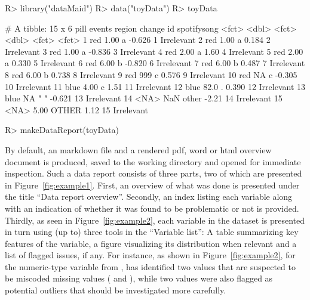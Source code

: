 \documentclass[article,shortnames]{jss}
\begin{document}
\begin{Schunk}
\begin{Sinput}
R> library("dataMaid")
R> data("toyData")
R> toyData
\end{Sinput}
\begin{Soutput}
# A tibble: 15 x 6
   pill  events region change id    spotifysong
   <fct>  <dbl> <fct>   <dbl> <fct> <fct>      
 1 red     1.00 a      -0.626 1     Irrelevant 
 2 red     1.00 a       0.184 2     Irrelevant 
 3 red     1.00 a      -0.836 3     Irrelevant 
 4 red     2.00 a       1.60  4     Irrelevant 
 5 red     2.00 a       0.330 5     Irrelevant 
 6 red     6.00 b      -0.820 6     Irrelevant 
 7 red     6.00 b       0.487 7     Irrelevant 
 8 red     6.00 b       0.738 8     Irrelevant 
 9 red   999    c       0.576 9     Irrelevant 
10 red    NA    c      -0.305 10    Irrelevant 
11 blue    4.00 c       1.51  11    Irrelevant 
12 blue   82.0  .       0.390 12    Irrelevant 
13 blue   NA    " "    -0.621 13    Irrelevant 
14 <NA>  NaN    other  -2.21  14    Irrelevant 
15 <NA>    5.00 OTHER   1.12  15    Irrelevant 
\end{Soutput}
\end{Schunk}

\begin{Schunk}
\begin{Sinput}
R> makeDataReport(toyData)
\end{Sinput}
\end{Schunk}

By default, an  markdown file and a rendered pdf,  word or html
overview document is produced, saved to the working directory and
opened for immediate inspection. Such a data report consists of three
parts, two of which are presented in Figure~\ref{fig:example1}. First,
an overview of what was done is presented under the title ``Data
  report overview''. Secondly, an index listing each variable along
with an indication of whether it was found to be problematic or not is
provided. Thirdly, as seen in Figure~\ref{fig:example2}, each variable
in the dataset is presented in turn using (up to) three tools in the
``Variable list'': A table summarizing key features of the
variable, a figure visualizing its distribution when relevant and a list of flagged
issues, if any. For instance, as shown in Figure~\ref{fig:example2},
for the numeric-type variable  from
,  has identified two values that
are suspected to be miscoded missing values ( and
), while two values were also flagged as potential outliers
that should be investigated more carefully.
\end{document}
